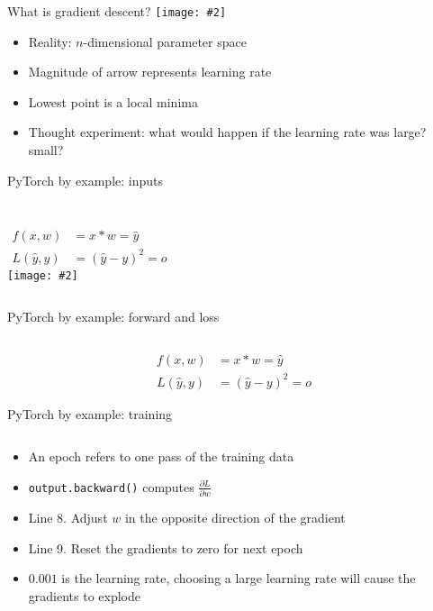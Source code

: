 \documentclass[hyperref={pdfpagelabels=false},12pt]{beamer}
\newcommand{\ig}[2]{\texttt{[image: \#2]}}
\newcommand{\code}[2]{\texttt{#2}}
\newcommand{\pygment}[3]{\inputminted[bgcolor=lightgray,linenos,fontsize=#1]{#2}{#3}}
\begin{document}
\begin{frame}{What is gradient descent?}
  \vspace*{-0.5cm}
  \centering
  \ig{0.4}{figures/gradient-descent.png}
  \begin{itemize}
    \item Reality: $n$-dimensional parameter space
    \item Magnitude of arrow represents learning rate
    \item Lowest point is a local minima
    \item Thought experiment: what would happen if the learning rate was large?
      small?
  \end{itemize}
\end{frame}

\begin{frame}{PyTorch by example: inputs}
  \centering
  \pygment{\scriptsize}{python}{code/basic-training.0.py}
  \vspace{-0.75cm}
  \begin{columns}
      \vspace{-2cm}
      \begin{align*}
        f(x, w) &= x * w = \hat{y} \\
        L(\hat{y}, y) &= (\hat{y} - y)^2 = o
      \end{align*}
      \ig{1.0}{figures/2x.png}
  \end{columns}
\end{frame}

\begin{frame}{PyTorch by example: forward and loss}
  \pygment{\scriptsize}{python}{code/basic-training.1.py}
  \begin{align*}
    f(x, w) &= x * w = \hat{y} \\
    L(\hat{y}, y) &= (\hat{y} - y)^2 = o
  \end{align*}
\end{frame}

\begin{frame}{PyTorch by example: training}
  \pygment{\scriptsize}{python}{code/basic-training.2.py}
  \vspace{-0.5cm}
  \begin{itemize}
      \item An epoch refers to one pass of the training data
      \item \code{python}{output.backward()} computes $\frac{\partial L}{\partial w}$
      \item Line 8. Adjust $w$ in the opposite direction of the gradient
      \item Line 9. Reset the gradients to zero for next epoch
      \item $0.001$ is the learning rate, choosing a large learning rate will cause
        the gradients to explode
  \end{itemize}
\end{frame}
\end{document}
